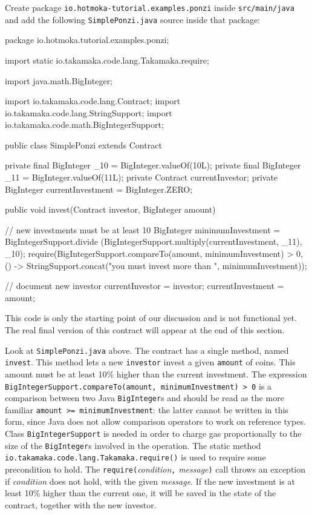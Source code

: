 %
Create package \texttt{io.hotmoka-tutorial.examples.ponzi} inside \texttt{src/main/java} and add
the following \texttt{SimplePonzi.java} source inside that package:
%
\begin{codebox}\begin{javalst}
package io.hotmoka.tutorial.examples.ponzi;

import static io.takamaka.code.lang.Takamaka.require;

import java.math.BigInteger;

import io.takamaka.code.lang.Contract;
import io.takamaka.code.lang.StringSupport;
import io.takamaka.code.math.BigIntegerSupport;

public class SimplePonzi extends Contract {
  private final BigInteger _10 = BigInteger.valueOf(10L);
  private final BigInteger _11 = BigInteger.valueOf(11L);
  private Contract currentInvestor;
  private BigInteger currentInvestment = BigInteger.ZERO;

  public void invest(Contract investor, BigInteger amount) {
    // new investments must be at least 10%
    BigInteger minimumInvestment = BigIntegerSupport.divide
      (BigIntegerSupport.multiply(currentInvestment, _11), _10);
    require(BigIntegerSupport.compareTo(amount, minimumInvestment) > 0,
      () -> StringSupport.concat("you must invest more than ", minimumInvestment));

    // document new investor
    currentInvestor = investor;
    currentInvestment = amount;
  }
}
\end{javalst}\end{codebox}
%
\begin{commentbox}
This code is only the starting point of our discussion and is not functional yet.
The real final version of this contract will appear at the end of this section.
\end{commentbox}

Look at \texttt{SimplePonzi.java} above. The contract has a single
method, named \texttt{invest}. This method lets a new \texttt{investor} invest
a given \texttt{amount} of coins. This amount must be at least 10\% higher than
the current investment. The expression
\texttt{BigIntegerSupport.compareTo(amount, minimumInvestment) > 0}
is a comparison between two Java \texttt{BigInteger}s and should be read as the
more familiar \texttt{amount >= minimumInvestment}: the latter cannot be
written in this form, since Java does not allow comparison operators
to work on reference types.
Class \texttt{BigIntegerSupport}
is needed in order to charge gas proportionally
to the size of the \texttt{BigInteger}s involved in the operation.
The static method \texttt{io.takamaka.code.lang.Takamaka.require()} is used to require
some precondition to hold. The \texttt{require(}\textit{condition}\texttt{,} \textit{message}\texttt{)} call throws an
exception if \textit{condition} does not hold, with the given \textit{message}.
If the new investment is at least 10\% higher than the current one, it will be
saved in the state of the contract, together with the new investor.

